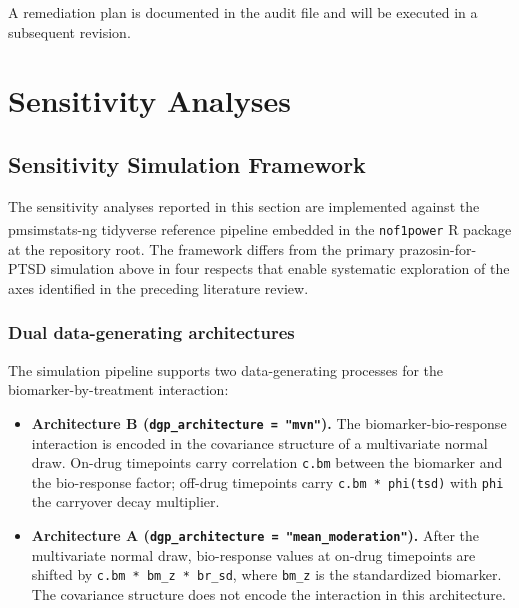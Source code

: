 \documentclass[
  11pt,
]{article}
\providecommand{\tightlist}{%
  \setlength{\itemsep}{0pt}\setlength{\parskip}{0pt}}
\begin{document}
A remediation plan is documented in the audit file and will be executed
in a subsequent revision.

\section{Sensitivity Analyses}\label{sensitivity-analyses-1}

\subsection{Sensitivity Simulation
Framework}\label{sensitivity-simulation-framework}

The sensitivity analyses reported in this section are implemented
against the pmsimstats-ng tidyverse reference
pipeline\textsuperscript{}
embedded in the \texttt{nof1power} R package at the repository root. The
framework differs from the primary prazosin-for-PTSD simulation above in
four respects that enable systematic exploration of the axes identified
in the preceding literature review.

\subsubsection{Dual data-generating
architectures}\label{dual-data-generating-architectures}

The simulation pipeline supports two data-generating processes for the
biomarker-by-treatment interaction:

\begin{itemize}
\tightlist
\item
  \textbf{Architecture B (\texttt{dgp\_architecture\ =\ "mvn"}).} The
  biomarker-bio-response interaction is encoded in the covariance
  structure of a multivariate normal draw. On-drug timepoints carry
  correlation \texttt{c.bm} between the biomarker and the bio-response
  factor; off-drug timepoints carry \texttt{c.bm\ *\ phi(tsd)} with
  \texttt{phi} the carryover decay multiplier.
\item
  \textbf{Architecture A
  (\texttt{dgp\_architecture\ =\ "mean\_moderation"}).} After the
  multivariate normal draw, bio-response values at on-drug timepoints
  are shifted by \texttt{c.bm\ *\ bm\_z\ *\ br\_sd}, where
  \texttt{bm\_z} is the standardized biomarker. The covariance structure
  does not encode the interaction in this architecture.
\end{itemize}
\end{document}
